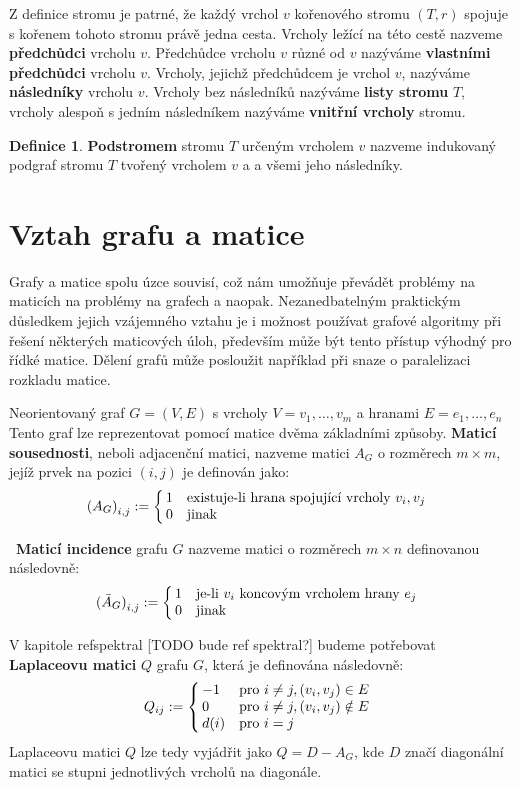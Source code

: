 \documentclass[11pt,american,czech,oneside]{book}
\theoremstyle{plain}
\theoremstyle{definition}
\newtheorem{definition}{Definice}
\begin{document}
Z definice stromu je patrné, že každý vrchol $v$ kořenového stromu $(T,r)$ spojuje s kořenem tohoto stromu právě jedna cesta.
Vrcholy ležící na této cestě nazveme \textbf{předchůdci} vrcholu $v$. Předchůdce vrcholu $v$ různé od $v$ nazýváme \textbf{vlastními předchůdci} vrcholu $v$. Vrcholy, jejichž předchůdcem je vrchol $v$, nazýváme \textbf{následníky} vrcholu $v$. Vrcholy bez následníků nazýváme \textbf{listy stromu} $T$, vrcholy alespoň s jedním následníkem nazýváme \textbf{vnitřní vrcholy} stromu.

\begin{definition}
  \textbf{Podstromem} stromu $T$ určeným vrcholem $v$ nazveme indukovaný podgraf stromu $T$ tvořený vrcholem $v$ a a všemi jeho následníky.
\end{definition}

\section{Vztah grafu a matice}
\label{GrMatRel}
Grafy a matice spolu úzce souvisí, což nám umožňuje převádět problémy na maticích na problémy na grafech a naopak. Nezanedbatelným praktickým důsledkem jejich vzájemného vztahu je i možnost používat grafové algoritmy při řešení některých maticových úloh, především může být tento přístup výhodný pro řídké matice. Dělení grafů může posloužit například při snaze o paralelizaci rozkladu matice.

Neorientovaný graf $G=(V,E)$ s vrcholy $V = {v_1, \ldots, v_m}$ a hranami $E = {e_1, \ldots, e_n}$ Tento graf lze reprezentovat pomocí matice dvěma základními způsoby. \textbf{Maticí sousednosti}, neboli adjacenční matici, nazveme matici $A_G$ o rozměrech $m \times m$, jejíž prvek na pozici $(i,j)$ je definován jako:
\[
  {(A_G)}_{i,j} :=
  \left\{
    \begin{array}{@{\,}ll}
      1  & \mbox{existuje-li hrana spojující vrcholy $v_i, v_j$} \\
      0  & \mbox{jinak}
    \end{array}
  \right.
\]

 \textbf{Maticí incidence} grafu $G$ nazveme matici o rozměrech $m \times n$  definovanou následovně:
\[
  {(\bar{A}_G)}_{i,j} :=
  \left\{
	  \begin{array}{@{\,}ll}
		  1  & \mbox{je-li $v_i$ koncovým vrcholem hrany $e_j$} \\
		  0  & \mbox{jinak}
	  \end{array}
  \right.
\]

V kapitole ref{spektral} [TODO bude ref spektral?] budeme potřebovat \textbf{Laplaceovu matici} $Q$ grafu $G$, která je definována následovně:
\[
Q_{ij} :=
\left\{
	\begin{array}{@{\,}ll}
		-1  & \mbox{pro } i \neq j, (v_i,v_j) \in E \\
		0 & \mbox{pro } i \neq j, (v_i,v_j) \notin E\\
        d(i) & \mbox{pro } i = j
	\end{array}
\right.
\]
Laplaceovu matici $Q$ lze tedy vyjádřit jako $Q = D - A_G$, kde $D$  značí diagonální matici se stupni jednotlivých vrcholů na diagonále.
\end{document}
